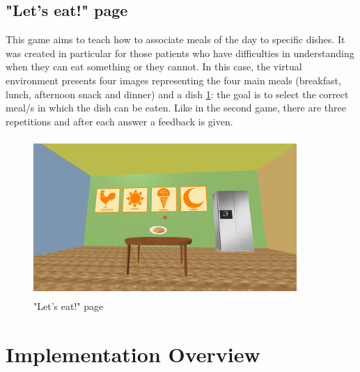 \subsection{"Let's eat!" page}
This game aims to teach how to associate meals of the day to specific dishes. It was created in particular
for those patients who have difficulties in understanding when they can eat something or they cannot. In this case, the virtual environment presents four images representing the four main meals (breakfast, lunch, afternoon snack and dinner) and a dish \ref{fig:eat}: the goal is to select the correct meal/s in which the dish can be eaten. Like in the second game, there are three repetitions and after each answer a feedback is given.
\begin{figure}[H]
\centering
\includegraphics[width=10cm, height=6cm]{immagini/Eat.png}
\caption{"Let's eat!" page}\label{fig:eat}
\end{figure}

\section{Implementation Overview}